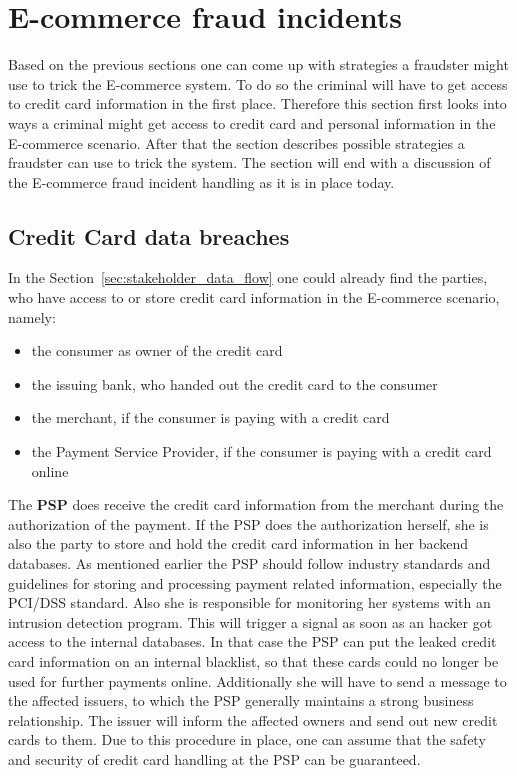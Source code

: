 
\section{E-commerce fraud incidents}
\label{sec:scenario_fraud}

Based on the previous sections one can come up with strategies a fraudster might use to trick the E-commerce system. To do so the criminal will have to get access to credit card information in the first place. Therefore this section first looks into ways a criminal might get access to credit card and personal information in the E-commerce scenario. After that the section describes possible strategies a fraudster can use to trick the system. The section will end with a discussion of the E-commerce fraud incident handling as it is in place today.

\subsection{Credit Card data breaches}
\label{subsec:leaking_credit_cards}

 In the Section~\ref{sec:stakeholder_data_flow} one could already find the parties, who have access to or store credit card information in the E-commerce scenario, namely:\@

\begin{itemize}
  \item the consumer as owner of the credit card
  \item the issuing bank, who handed out the credit card to the consumer
  \item the merchant, if the consumer is paying with a credit card
  \item the Payment Service Provider, if the consumer is paying with a credit card online
\end{itemize}

The \textbf{\gls{PSP}} does receive the credit card information from the merchant during the authorization of the payment. If the \gls{PSP} does the authorization herself, she is also the party to store and hold the credit card information in her backend databases. As mentioned earlier the \gls{PSP} should follow industry standards and guidelines for storing and processing payment related information, especially the PCI/DSS standard. Also she is responsible for monitoring her systems with an intrusion detection program. This will trigger a signal as soon as an hacker got access to the internal databases. In that case the \gls{PSP} can put the leaked credit card information on an internal blacklist, so that these cards could no longer be used for further payments online. Additionally she will have to send a message to the affected issuers, to which the \gls{PSP} generally maintains a strong business relationship. The issuer will inform the affected owners and send out new credit cards to them. Due to this procedure in place, one can assume that the safety and security of credit card handling at the \gls{PSP} can be guaranteed. \\

